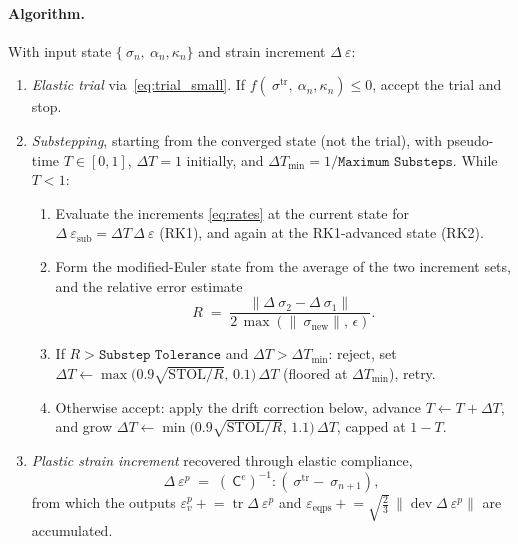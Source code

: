 \documentclass[12pt]{article}
\DeclareMathOperator{\trace}{tr}
\DeclareMathOperator{\dev}{dev}
\newcommand{\stress}{~\sigma}
\newcommand{\backstress}{~\alpha}
\newcommand{\pstrain}{{~\varepsilon^p}}
\newcommand{\strainincr}{\Delta~\varepsilon}
\newcommand{\Celast}{{~{\mathsf C}^e}}
\begin{document}
\paragraph{Algorithm.}
With input state $\{\stress_n, \backstress_n, \kappa_n\}$ and strain
increment $\strainincr$:
\begin{enumerate}
\item \emph{Elastic trial} via~\eqref{eq:trial_small}. If
      $f(\stress^{\mathrm{tr}}, \backstress_n, \kappa_n) \le 0$,
      accept the trial and stop.
\item \emph{Substepping}, starting from the converged state (not the
      trial), with pseudo-time $T \in [0,1]$, $\Delta T = 1$
      initially, and $\Delta T_{\min} = 1/\texttt{Maximum Substeps}$.
      While $T < 1$:
      \begin{enumerate}
      \item Evaluate the increments \eqref{eq:rates} at the current
            state for $\strainincr_{\mathrm{sub}}
            = \Delta T\,\strainincr$ (RK1), and again at the
            RK1-advanced state (RK2).
      \item Form the modified-Euler state from the average of the two
            increment sets, and the relative error estimate
            \begin{equation}
              R \;=\; \frac{\|\Delta\stress_2 - \Delta\stress_1\|}
                           {2\,\max(\|\stress_{\mathrm{new}}\|,\,
                            \epsilon)} .
            \end{equation}
      \item If $R > \texttt{Substep Tolerance}$ and
            $\Delta T > \Delta T_{\min}$: reject, set
            $\Delta T \leftarrow
            \max\bigl(0.9\sqrt{\mathrm{STOL}/R},\,0.1\bigr)\,\Delta T$
            (floored at $\Delta T_{\min}$), retry.
      \item Otherwise accept: apply the drift correction below,
            advance $T \leftarrow T + \Delta T$, and grow
            $\Delta T \leftarrow
            \min\bigl(0.9\sqrt{\mathrm{STOL}/R},\,1.1\bigr)\,\Delta T$,
            capped at $1 - T$.
      \end{enumerate}
\item \emph{Plastic strain increment} recovered through elastic
      compliance,
      \begin{equation}
        \Delta\pstrain \;=\; (\Celast)^{-1} : (\stress^{\mathrm{tr}}
                                              - \stress_{n+1}),
      \end{equation}
      from which the outputs
      $\varepsilon_v^p \mathrel{+}= \trace\Delta\pstrain$ and
      $\varepsilon_{\mathrm{eqps}} \mathrel{+}=
      \sqrt{\tfrac{2}{3}}\,\|\dev\Delta\pstrain\|$ are accumulated.
\end{enumerate}
\end{document}
